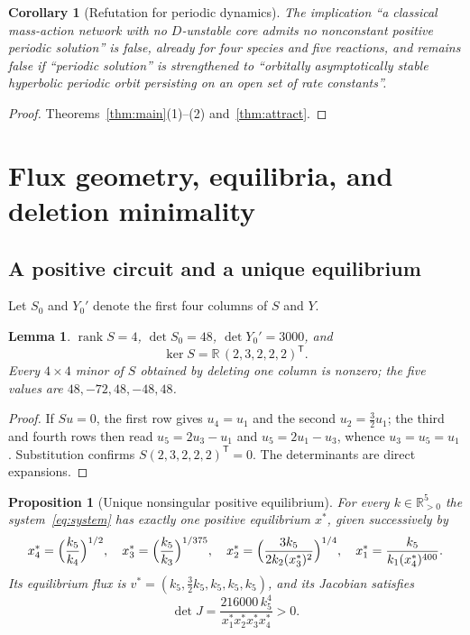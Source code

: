 \documentclass[11pt,a4paper]{article}
\theoremstyle{plain}
\newtheorem{proposition}[theorem]{Proposition}
\newtheorem{lemma}[theorem]{Lemma}
\newtheorem{corollary}[theorem]{Corollary}
\theoremstyle{definition}
\theoremstyle{remark}
\newcommand{\R}{\mathbb{R}}
\newcommand{\xs}{x^{*}}
\newcommand{\vs}{v^{*}}
\begin{document}
\begin{corollary}[Refutation for periodic dynamics]\label{cor:refutation}
The implication ``a classical mass-action network with no $D$-unstable core admits no nonconstant positive periodic solution'' is false, already for four species and five reactions, and remains false if ``periodic solution'' is strengthened to ``orbitally asymptotically stable hyperbolic periodic orbit persisting on an open set of rate constants''.
\end{corollary}

\begin{proof}
Theorems~\ref{thm:main}(1)--(2) and~\ref{thm:attract}.
\end{proof}

\section{Flux geometry, equilibria, and deletion minimality}\label{sec:flux}

\subsection{A positive circuit and a unique equilibrium}\label{sec:circuit}

Let $S_0$ and $Y_0'$ denote the first four columns of $S$ and $Y$.

\begin{lemma}\label{lem:circuit}
$\operatorname{rank}S=4$, $\det S_0=48$, $\det Y_0'=3000$, and
\begin{equation}\label{eq:circuit}
\ker S=\R\,(2,3,2,2,2)^{\mathsf T}.
\end{equation}
Every $4\times4$ minor of $S$ obtained by deleting one column is nonzero; the five values are $48,-72,48,-48,48$.
\end{lemma}

\begin{proof}
If $Su=0$, the first row gives $u_4=u_1$ and the second $u_2=\tfrac32u_1$; the third and fourth rows then read $u_5=2u_3-u_1$ and $u_5=2u_1-u_3$, whence $u_3=u_5=u_1$. Substitution confirms $S(2,3,2,2,2)^{\mathsf T}=0$. The determinants are direct expansions.
\end{proof}

\begin{proposition}[Unique nonsingular positive equilibrium]\label{prop:eq}
For every $k\in\R_{>0}^5$ the system~\eqref{eq:system} has exactly one positive equilibrium $\xs$, given successively by
\begin{equation}\label{eq:equilibrium}
x_4^*=\Bigl(\frac{k_5}{k_4}\Bigr)^{1/2},\quad
x_3^*=\Bigl(\frac{k_5}{k_3}\Bigr)^{1/375},\quad
x_2^*=\Bigl(\frac{3k_5}{2k_2(x_3^*)^2}\Bigr)^{1/4},\quad
x_1^*=\frac{k_5}{k_1(x_4^*)^{400}} .
\end{equation}
Its equilibrium flux is $\vs=(k_5,\tfrac32k_5,k_5,k_5,k_5)$, and its Jacobian satisfies
\begin{equation}\label{eq:detJ}
\det J=\frac{216000\,k_5^4}{x_1^*x_2^*x_3^*x_4^*}>0 .
\end{equation}
\end{proposition}
\end{document}
